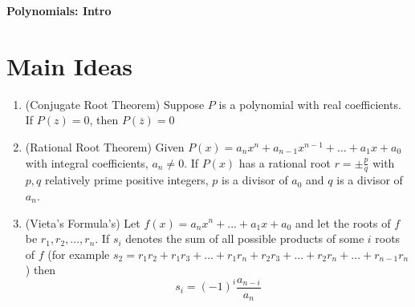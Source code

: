 \documentclass[11pt]{article}
\theoremstyle{theorem}
\theoremstyle{definition}
\theoremstyle{remark}
\theoremstyle{definition}
\theoremstyle{remark}
\begin{document}
\begin{center} 
        \Large \textbf{Polynomials: Intro}
\end{center}
\section{Main Ideas}
\begin{enumerate}
\item (Conjugate Root Theorem) Suppose $P$ is a polynomial with real coefficients. If $P(z)=0$, then $P(\overline{z})=0$
\item (Rational Root Theorem) Given $P(x) = a_n x^n + a_{n - 1}x^{n - 1} + \ldots + a_1 x + a_0$ with integral coefficients, $a_n \neq 0$. If $P(x)$ has a rational root $r = \pm\frac{p}{q}$ with $p, q$ relatively prime positive integers, $p$ is a divisor of $a_0$ and $q$ is a divisor of $a_n$.
\item  (Vieta's Formula's) Let $f(x)=a_nx^n+...+a_1x+a_0$ and let the roots of $f$ be $r_1,r_2,...,r_n$. If $s_i$ denotes the sum of all possible products of some $i$ roots of $f$ (for example $s_2=r_1r_2+r_1r_3+...+r_1r_n+r_2r_3+...+r_2r_n+...+r_{n-1}r_n$) then
\begin{equation*}
s_i=(-1)^i\frac{a_{n-i}}{a_n}
\end{equation*} 
\end{enumerate}
\end{document}
